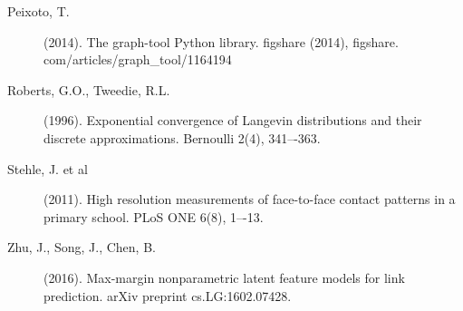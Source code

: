 \begin{description}
	\item[Peixoto, T.] (2014).
	The graph-tool Python library. figshare (2014), figshare. com/articles/graph\_tool/1164194

	\item[Roberts, G.O., Tweedie, R.L.] (1996).
	Exponential convergence of Langevin distributions and their discrete approximations.
	Bernoulli 2(4), 341–-363.

	\item[Stehle, J. et al] (2011).
	High resolution measurements of face-to-face contact patterns in a primary school.
	PLoS ONE 6(8), 1–-13.

	\item[Zhu, J., Song, J., Chen, B.] (2016).
	Max-margin nonparametric latent feature models for link prediction.
	arXiv preprint cs.LG:1602.07428.
\end{description}